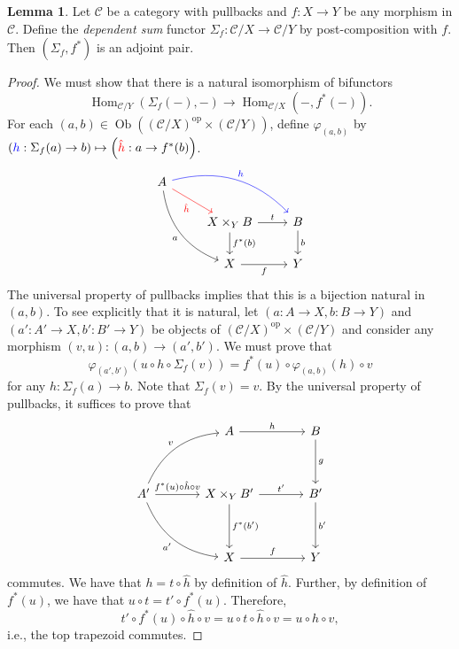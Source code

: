 \documentclass[10pt,letterpaper,cm]{nupset}
\theoremstyle{definition}
\theoremstyle{theorem}
\newtheorem{lemma}[definition]{Lemma}
\theoremstyle{remark}
\DeclareMathOperator{\ob}{Ob}
\newcommand{\0}{\mathbf{0}}
\newcommand{\1}{\mathbf{1}}
\newcommand{\2}{\mathbf{2}}
\DeclareMathOperator{\op}{op}
\renewcommand{\c}{\mathscr{C}}
\DeclareMathOperator{\Hom}{Hom}
\begin{document}
\begin{lemma}
Let $\c$ be a category with pullbacks and $f : X \to Y$ be any morphism in $\c$. Define the \textit{dependent sum} functor $\Sigma_f : \c/X \to \c/Y$ by post-composition with $f$. Then $\left(\Sigma_f, f^{\ast}\right)$ is an adjoint pair.
\end{lemma}
\begin{proof}
We must show that there is a natural isomorphism of bifunctors
\[
 \Hom_{\c/Y}\left(\Sigma_f({-}), {-}\right) \to \Hom_{\c/X}({-}, f^{\ast}({-}))
.\]
For each $\left(a, b\right) \in \ob\left(\left(\c/X\right)^{\op} \times \left(\c/Y\right)\right)$, define $\varphi_{(a, b)}$ by $\left(\mathbin{\textcolor{blue}{h}} : \Sigma_f(a) \to b\right) \mapsto \left(\mathbin{\textcolor{red}{\hat{h}}} : a \to f^{\ast}(b)\right)$.
\[
\begin{tikzcd}
A \arrow[rd, "\hat{h}"', red] \arrow[rrd, "h", bend left, blue] \arrow[rdd, "a"', bend right] &                                  &                  \\
                                                                                        & X \times_Y B \arrow[r, "t"] \arrow[d, "f^{\ast}(b)"] & B \arrow[d, "b"] \\
                                                                                        & X \arrow[r, "f"']                & Y               
\end{tikzcd}
\] The universal property of pullbacks implies that this is a bijection natural in $\left(a,b\right)$. To see explicitly that it is natural, let  $\left(a: A \to X, b: B \to Y\right)$ and $\left(a' : A' \to X, b': B' \to Y\right)$ be objects of $\left(\c/X\right)^{\op} \times \left(\c/Y\right)$ and consider any morphism $\left(v, u\right) : \left(a,b\right) \to \left(a',b'\right)$. We must prove that $$\varphi_{\left(a',b'\right)}\left(u \circ h \circ \Sigma_f(v)\right) = f^{\ast}(u) \circ \varphi_{(a,b)}(h) \circ v$$ for any $h : \Sigma_f(a) \to b$. Note that $\Sigma_f(v) = v$. By the universal property of pullbacks, it suffices to prove that 
\[
\begin{tikzcd}[row sep=huge, column sep=large]
                                                                                                          & A \arrow[r, "h"]                                       & B \arrow[d, "g"]   \\
A' \arrow[r, "f^{\ast}(u) \circ \hat{h}\circ v"] \arrow[ru, "v", bend left] \arrow[rd, "a'"', bend right] & X\times_Y B' \arrow[d, "f^{\ast}(b')"] \arrow[r, "t'"] & B' \arrow[d, "b'"] \\
                                                                                                          & X \arrow[r, "f"]                                       & Y                 
\end{tikzcd}
\]
commutes. We have that $ h =  t \circ \hat{h}$ by definition of $\hat{h}$. Further, by definition of $f^{\ast}(u)$, we have that $u \circ t = t' \circ f^{\ast}(u)$. Therefore, $$t' \circ f^{\ast}(u) \circ \hat{h} \circ v = u \circ t \circ \hat{h}\circ v = u\circ h \circ v,$$ i.e., the top trapezoid commutes. 


\end{proof}
\end{document}
